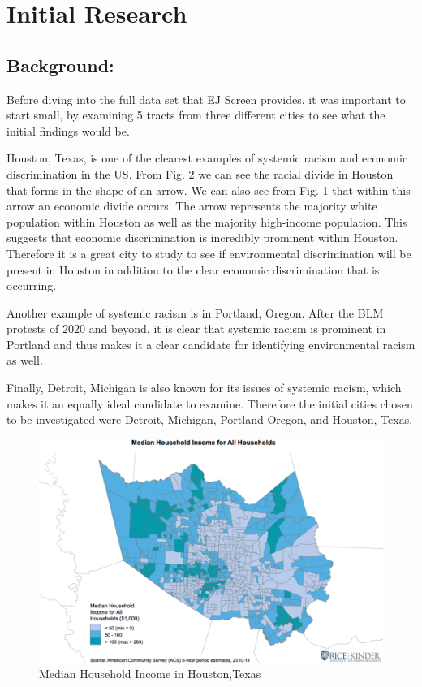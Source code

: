 \documentclass[letterpaper, 10 pt, conference]{ieeeconf}  %
\begin{document}
\section{Initial Research}

\subsection{Background:}
Before diving into the full data set that EJ Screen provides, it was important to start small, by examining 5 tracts from three different cities to see what the initial findings would be.\par

Houston, Texas, is one of the clearest examples of systemic racism and economic discrimination in the US. From Fig. 2 we can see the racial divide in Houston that forms in the shape of an arrow. We can also see from Fig. 1 that within this arrow an economic divide occurs. The arrow represents the majority white population within Houston as well as the majority high-income population. This suggests that economic discrimination is incredibly prominent within Houston. Therefore it is a great city to study to see if environmental discrimination will be present in Houston in addition to the clear economic discrimination that is occurring.\par 

Another example of systemic racism is in Portland, Oregon. After the BLM protests of 2020 and beyond, it is clear that systemic racism is prominent in Portland and thus makes it a clear candidate for identifying environmental racism as well.
\par

Finally, Detroit, Michigan is also known for its issues of systemic racism, which makes it an equally ideal candidate to examine. Therefore the initial cities chosen to be investigated were Detroit, Michigan, Portland Oregon, and Houston, Texas. \par




\begin{figure}
    \centering
    \includegraphics[width=1\linewidth]{Images/map1.png}
    \caption{Median Household Income in Houston,Texas \cite{Binkovitz_2016}}
    \label{fig:enter-label}
\end{figure}
\end{document}
